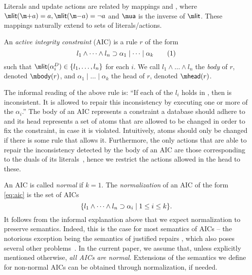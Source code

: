 Literals and update actions are related by mappings \litof and \actof, where $\litof(\add a)= a, \litof(\remove a) = \lnot a$ and $\actof$ is the inverse of $\litof$.
These mappings naturally extend to sets of literals/actions. 

\begin{definition}
 An \emph{active integrity constraint} (AIC) is a rule $r$ of the form
  \begin{equation} l_1\land \dots\land l_n\supset \alpha_1\mid\dots \mid \alpha_k \tag{1}\label{eq:aic}\end{equation}
  such that $\litof(\alpha_i^D) \in \{l_1,\dots,l_n\}$ for each $i$.
%  
  We call $l_1\land \dots \land l_n$ the \emph{body} of $r$, denoted $\body(r)$, and $\alpha_1\mid\dots \mid \alpha_k$ the head of $r$, denoted $\head (r)$.
\end{definition}

The informal reading of the above rule is: ``If each of the $l_i$ holds in \db, then \db is inconsistent. 
It is allowed to repair this inconsistency by executing one or more of the $\alpha_i$.''
The body of an AIC represents a constraint a database should adhere to and its head represents a set of atoms that are allowed to be changed in order to fix the constraint, in case it is violated. 
Intuitively, atoms should only be changed if there is some rule that allows it.
Furthermore, the only actions that are able to repair the inconsistency detected by the body of an AIC are those corresponding to the duals of its literals~\cite{iclp/CaropreseGSZ06}, hence we restrict the actions allowed in the head to these.


An AIC is called \emph{normal} if $k=1$. The \emph{normalization} of an AIC of the form \eqref{eq:aic} is the set of AICs 
\[\{l_1\land \dots\land l_n\supset \alpha_i\mid 1\leq i\leq k\}.\]
It follows from the informal explanation above that we expect normalization to preserve semantics. Indeed, this is the case for most semantics of AICs -- the notorious exception being the semantics of justified repairs \cite{tplp/CaropreseT11}, which also poses several other problems~\cite{tase/Cruz-FilipeGEN13}.
In the current paper, we assume that, unless explicitly mentioned otherwise, \emph{all AICs are normal}. Extensions of the semantics we define for non-normal AICs can be obtained through normalization, if needed.

